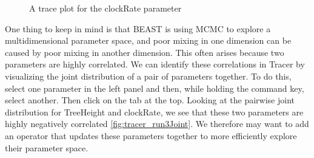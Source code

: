 \documentclass[11pt]{article}
\begin{document}
\begin{figure}[!h]
\centering
{}
\caption{\small A trace plot for the clockRate parameter}
\label{fig:tracer_run3}
\end{figure} 

One thing to keep in mind is that BEAST is using MCMC to explore a multidimensional parameter space, and poor mixing in one dimension can be caused by poor mixing in another dimension. This often arises because two parameters are highly correlated. We can identify these correlations in Tracer by visualizing the joint distribution of a pair of parameters together. To do this, select one parameter in the left panel and then, while holding the command key, select another. Then click on the  tab at the top. Looking at the pairwise joint distribution for TreeHeight and clockRate, we see that these two parameters are highly negatively correlated \ref{fig:tracer_run3Joint}. We therefore may want to add an operator that updates these parameters together to more efficiently explore their parameter space.
\end{document}
